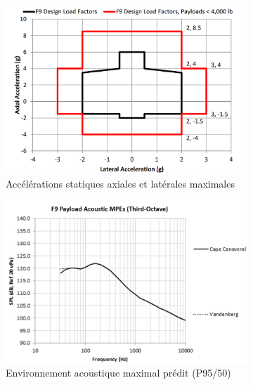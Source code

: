 \begin{figure}%
     \centering
     \begin{subfigure}[]{0.48\textwidth}
         \centering
         \includegraphics[width=\textwidth]{Img/falcon_static.png}
         \caption{Accélérations statiques axiales et latérales maximales}
         \label{fig:falcon9_static}
     \end{subfigure}
     \hfill
     \begin{subfigure}[]{0.48\textwidth}
         \centering
         \includegraphics[width=\textwidth]{Img/falcon_acoustic.png}
         \caption{Environnement acoustique maximal prédit (P95/50)}
         \label{fig:falcon9_acoustic}
     \end{subfigure}
     \\
     \begin{subfigure}[]{0.48\textwidth}

\end{subfigure}
\end{figure}

